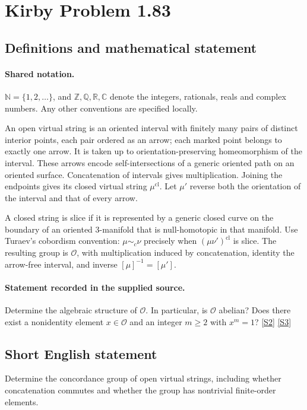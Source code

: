\documentclass[11pt]{article}
\newcommand{\sref}[2]{\hyperlink{source:#1:#2}{[S#2]}}
\begin{document}
\section{Kirby Problem 1.83}\label{statement}

\subsection{Definitions and mathematical statement}

\paragraph{Shared notation.}$\mathbb N=\{1,2,\ldots\}$, and $\mathbb Z,\mathbb Q,\mathbb R,\mathbb C$ denote the integers, rationals, reals and complex numbers. Any other conventions are specified locally.


An open virtual string is an oriented interval with finitely many pairs of distinct interior points, each pair ordered as an arrow; each marked point belongs to exactly one arrow. It is taken up to orientation-preserving homeomorphism of the interval. These arrows encode self-intersections of a generic oriented path on an oriented surface. Concatenation of intervals gives multiplication. Joining the endpoints gives its closed virtual string $\mu^{\mathrm{cl}}$. Let $\mu'$ reverse both the orientation of the interval and that of every arrow.

A closed string is slice if it is represented by a generic closed curve on the boundary of an oriented 3-manifold that is null-homotopic in that manifold. Use Turaev's cobordism convention: $\mu\sim_c\nu$ precisely when $(\mu\nu')^{\mathrm{cl}}$ is slice. The resulting group is $\mathcal O$, with multiplication induced by concatenation, identity the arrow-free interval, and inverse $[\mu]^{-1}=[\mu']$.
\paragraph{Statement recorded in the supplied source.}
Determine the algebraic structure of $\mathcal O$. In particular, is $\mathcal O$ abelian? Does there exist a nonidentity element $x\in\mathcal O$ and an integer $m\ge2$ with $x^m=1$? \sref{statement}{2} \sref{statement}{3}

\subsection{Short English statement}
Determine the concordance group of open virtual strings, including whether concatenation commutes and whether the group has nontrivial finite-order elements.
\end{document}
